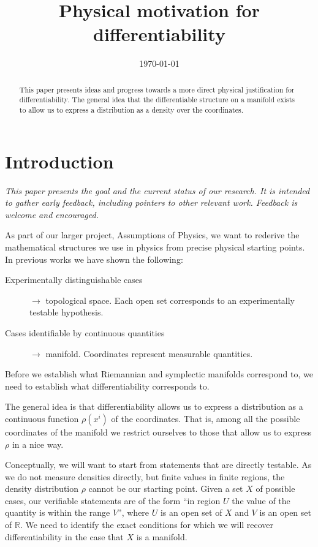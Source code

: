 \documentclass[10pt, onecolumn, longbibliography, nofootinbib]{revtex4-2}
\begin{document}
\title{Physical motivation for differentiability}
\date{\today}

\begin{abstract}
	This paper presents ideas and progress towards a more direct physical justification for differentiability. The general idea that the differentiable structure on a manifold exists to allow us to express a distribution as a density over the coordinates.
\end{abstract}

\maketitle

\section{Introduction}

\emph{This paper presents the goal and the current status of our research. It is intended to gather early feedback, including pointers to other relevant work. Feedback is welcome and encouraged.}

As part of our larger project, Assumptions of Physics, we want to rederive the mathematical structures we use in physics from precise physical starting points. In previous works we have shown the following:
\begin{description}
	\item[Experimentally distinguishable cases] $\to$ topological space. Each open set corresponds to an experimentally testable hypothesis.
	\item[Cases identifiable by continuous quantities] $\to$ manifold. Coordinates represent measurable quantities.
\end{description}
Before we establish what Riemannian and symplectic manifolds correspond to, we need to establish what differentiability corresponds to.

The general idea is that differentiability allows us to express a distribution as a continuous function $\rho(x^i)$ of the coordinates. That is, among all the possible coordinates of the manifold we restrict ourselves to those that allow us to express $\rho$ in a nice way.

Conceptually, we will want to start from statements that are directly testable. As we do not measure densities directly, but finite values in finite regions, the density distribution $\rho$ cannot be our starting point. Given a set $X$ of possible cases, our verifiable statements are of the form ``in region $U$ the value of the quantity is within the range $V$'', where $U$ is an open set of $X$ and $V$ is an open set of $\mathbb{R}$. We need to identify the exact conditions for which we will recover differentiability in the case that $X$ is a manifold.
\end{document}
